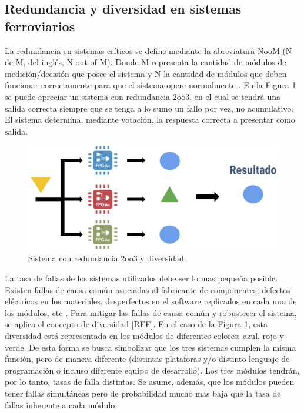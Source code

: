 \subsection{Redundancia y diversidad en sistemas ferroviarios}

	La redundancia en sistemas críticos se define mediante la abreviatura NooM (N de M, del inglés, N out of M). Donde M representa la cantidad de módulos de medición/decisión que posee el sistema y N la cantidad de módulos que deben funcionar correctamente para que el sistema opere normalmente \cite{Paper_12,Paper_41,Paper_47,Paper_78,Paper_80,Paper_82,Paper_84}. En la Figura \ref{fig:redundancia} se puede apreciar un sistema con redundancia 2oo3, en el cual se tendrá una salida correcta siempre que se tenga a lo sumo un fallo por vez, no acumulativo. El sistema determina, mediante votación, la respuesta correcta a presentar como salida.
	
	\begin{figure}[h]
		\centering
		\includegraphics[width=1\textwidth]{Figuras/redundancia.png}
		\centering\caption{Sistema con redundancia 2oo3 y diversidad.}
		\label{fig:redundancia}
	\end{figure}
	
	La tasa de fallas de los sistemas utilizados debe ser lo mas pequeña posible. Existen fallas de causa común asociadas al fabricante de componentes, defectos eléctricos en los materiales, desperfectos en el software replicados en cada uno de los módulos, etc \cite{Paper_30,Paper_32,Paper_42,Paper_47,Paper_77,Paper_83,Paper_84,Paper_118,Paper_122,Paper_124,Paper_125,Paper_127,Paper_131,Paper_132,Paper_136,Paper_138,Paper_140}. Para mitigar las fallas de causa común y robustecer el sistema, se aplica el concepto de diversidad [REF]. En el caso de la Figura \ref{fig:redundancia}, esta diversidad está representada en los módulos de diferentes colores: azul, rojo y verde. De esta forma se busca simbolizar que los tres sistemas cumplen la misma función, pero de manera diferente (distintas plataforas y/o distinto lenguaje de programación o incluso diferente equipo de desarrollo). Los tres módulos tendrán, por lo tanto, tasas de falla distintas. Se asume, además, que los módulos pueden tener fallas simultáneas pero de probabilidad mucho mas baja que la tasa de fallas inherente a cada módulo.
	
